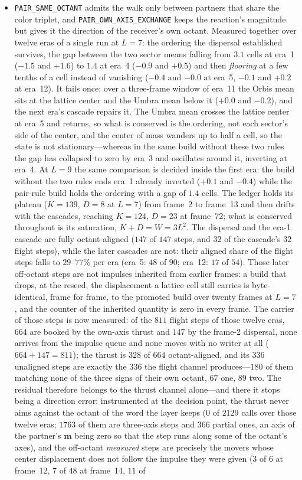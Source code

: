 \documentclass[a4paper]{article}
\begin{document}
\begin{itemize}
\item \texttt{PAIR\_SAME\_OCTANT} admits the walk only between partners that share the color triplet, and \texttt{PAIR\_OWN\_AXIS\_EXCHANGE} keeps the reaction's magnitude but gives it the direction of the receiver's own octant.  Measured together over twelve eras of a single run at $L=7$: the ordering the dispersal established survives, the gap between the two sector means falling from $3.1$ cells at era~1 ($-1.5$ and $+1.6$) to $1.4$ at era~4 ($-0.9$ and $+0.5$) and then \emph{flooring} at a few tenths of a cell instead of vanishing ($-0.4$ and $-0.0$ at era~5, $-0.1$ and $+0.2$ at era~12).  It fails once: over a three-frame window of era~11 the Orbis mean sits at the lattice center and the Umbra mean below it ($+0.0$ and $-0.2$), and the next era's cascade repairs it.  The Umbra mean crosses the lattice center at era~5 and returns, so what is conserved is the ordering, not each sector's side of the center, and the center of mass wanders up to half a cell, so the state is not stationary---whereas in the same build without these two rules the gap has collapsed to zero by era~3 and oscillates around it, inverting at era~4.  At $L=9$ the same comparison is decided inside the first era: the build without the two rules ends era~1 already inverted ($+0.1$ and $-0.4$) while the pair-rule build holds the ordering with a gap of $1.4$ cells.  The ledger holds its plateau ($K=139$, $D=8$ at $L=7$) from frame~2 to frame~13 and then drifts with the cascades, reaching $K=124$, $D=23$ at frame~72; what is conserved throughout is its saturation, $K+D=W=3L^2$.  The dispersal and the era-1 cascade are fully octant-aligned ($147$ of $147$ steps, and $32$ of the cascade's $32$ flight steps), while the later cascades are not: their aligned share of the flight steps falls to $29$--$77\%$ per era (era~5: $48$ of $90$; era~12: $17$ of $54$).  Those later off-octant steps are not impulses inherited from earlier frames: a build that drops, at the reseed, the displacement a lattice cell still carries is byte-identical, frame for frame, to the promoted build over twenty frames at $L=7$, and the counter of the inherited quantity is zero in every frame.  The carrier of those steps is now measured: of the $811$ flight steps of those twelve eras, $664$ are booked by the own-axis thrust and $147$ by the frame-2 dispersal, none arrives from the impulse queue and none moves with no writer at all ($664+147=811$); the thrust is $328$ of $664$ octant-aligned, and its $336$ unaligned steps are exactly the $336$ the flight channel produces---$180$ of them matching none of the three signs of their own octant, $67$ one, $89$ two.  The residual therefore belongs to the thrust channel alone---and there it stops being a direction error: instrumented at the decision point, the thrust never aims against the octant of the word the layer keeps ($0$ of $2129$ calls over those twelve eras; $1763$ of them are three-axis steps and $366$ partial ones, an axis of the partner's $\boldsymbol m$ being zero so that the step runs along some of the octant's axes), and the off-octant \emph{measured} steps are precisely the movers whose center displacement does not follow the impulse they were given ($3$ of $6$ at frame~12, $7$ of $48$ at frame~14, $11$ of 
\end{itemize}
\end{document}
